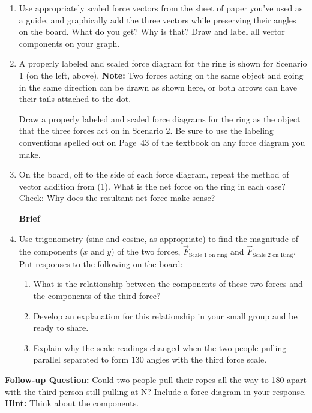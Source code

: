\begin{enumerate}
	\item Use appropriately scaled force vectors from the sheet of paper you've used as a guide, and graphically add the three vectors while preserving their angles on the board. What do you get? Why is that? Draw and label all vector components on your graph.
	
	\item A properly labeled and scaled force diagram for the ring is shown for Scenario 1 (on the left, above). \textbf{Note:} Two forces acting on the same object and going in the same direction can be drawn as shown here, or both arrows can have their tails attached to the dot.
	
	Draw a properly labeled and scaled force diagrams for the ring as the object that the three forces act on in Scenario 2. Be sure to use the labeling conventions spelled out on Page~43 of the textbook on any force diagram you make.
	
	\item On the board, off to the side of each force diagram, repeat the method of vector addition from (1). What is the net force on the ring in each case? Check: Why does the resultant net force make sense?

\vspace{12pt}
\hspace{-\textwidth}\hspace{\linewidth} \textbf{Brief}
\hspace{\textwidth}\hspace{-\linewidth}
\WCD
	
	\item Use trigonometry (sine and cosine, as appropriate) to find the magnitude of the components ($x$ and $y$) of the two forces, $\vec{F}_\text{Scale 1 on ring}$ and $\vec{F}_\text{Scale 2 on Ring}$. Put responses to the following on the board:
	\begin{enumerate}
		\item What is the relationship between the components of these two forces and the components of the third force?
		
		\item Develop an explanation for this relationship in your small group and be ready to share.
		
		\item Explain why the scale readings changed when the two people pulling parallel separated to form 130\textdegree{} angles with the third force scale.
	\end{enumerate}
\end{enumerate}

\WCD
\vspace{12pt}

\noindent \textbf{Follow-up Question:} Could two people pull their ropes all the way to 180\textdegree{} apart with the third person still pulling at \unit[30]{N}? Include a force diagram in your response. \textbf{Hint:} Think about the components.
 
\vspace{12pt}
\WCD
